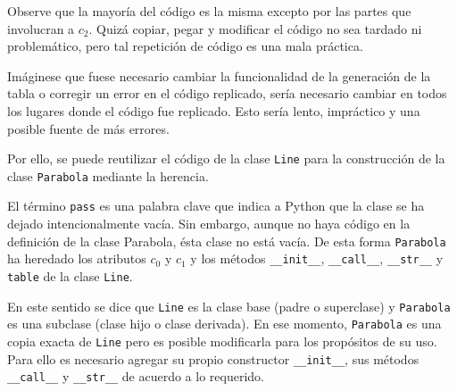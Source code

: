 Observe que la mayoría del código es la misma excepto por las partes que
involucran a \(c_2\). Quizá copiar, pegar y modificar el código no sea
tardado ni problemático, pero tal repetición de código es una mala
práctica.

Imáginese que fuese necesario cambiar la funcionalidad de la generación
de la tabla o corregir un error en el código replicado, sería necesario
cambiar en todos los lugares donde el código fue replicado. Esto sería
lento, impráctico y una posible fuente de más errores.

Por ello, se puede reutilizar el código de la clase \texttt{Line} para
la construcción de la clase \texttt{Parabola} mediante la herencia.

\begin{Shaded}
\begin{Highlighting}[]
\end{Highlighting}
\end{Shaded}

El término \texttt{pass} es una palabra clave que indica a Python que la
clase se ha dejado intencionalmente vacía. Sin embargo, aunque no haya
código en la definición de la clase Parabola, ésta clase no está vacía.
De esta forma \texttt{Parabola} ha heredado los atributos \(c_0\) y
\(c_1\) y los métodos \texttt{\_\_init\_\_}, \texttt{\_\_call\_\_},
\texttt{\_\_str\_\_} y \texttt{table} de la clase \texttt{Line}.

En este sentido se dice que \texttt{Line} es la clase base (padre o
superclase) y \texttt{Parabola} es una subclase (clase hijo o clase
derivada). En ese momento, \texttt{Parabola} es una copia exacta de
\texttt{Line} pero es posible modificarla para los propósitos de su uso.
Para ello es necesario agregar su propio constructor
\texttt{\_\_init\_\_}, sus métodos \texttt{\_\_call\_\_} y
\texttt{\_\_str\_\_} de acuerdo a lo requerido.\\

